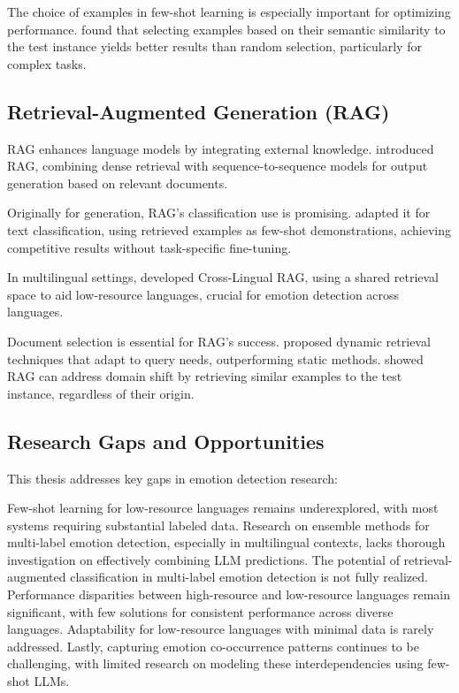 \documentclass[a4paper,12pt]{extarticle}
\begin{document}
The choice of examples in few-shot learning is especially important for optimizing performance. 
\cite{liu2022few} found that selecting examples based on their semantic similarity to the test instance yields better results than random selection, particularly for complex tasks. 

\subsection{Retrieval-Augmented Generation (RAG)}

RAG enhances language models by integrating external knowledge. 
\cite{lewis2020retrieval} introduced RAG, combining dense retrieval with sequence-to-sequence models for output generation based on relevant documents.

Originally for generation, RAG's classification use is promising. 
\cite{gao2024retrieval} adapted it for text classification, using retrieved examples as few-shot demonstrations, achieving competitive results without task-specific fine-tuning.

In multilingual settings, 
\cite{shi2023replug} developed Cross-Lingual RAG, using a shared retrieval space to aid low-resource languages, crucial for emotion detection across languages.

Document selection is essential for RAG's success. 
\cite{gao2023retrieval} proposed dynamic retrieval techniques that adapt to query needs, outperforming static methods. 
\cite{singh2022flare} showed RAG can address domain shift by retrieving similar examples to the test instance, regardless of their origin.
\subsection{Research Gaps and Opportunities}

This thesis addresses key gaps in emotion detection research: 

Few-shot learning for low-resource languages remains underexplored, 
with most systems requiring substantial labeled data. 
Research on ensemble methods for multi-label emotion detection, especially in multilingual contexts, lacks thorough investigation on effectively combining LLM predictions. 
The potential of retrieval-augmented classification in multi-label emotion detection is not fully realized. 
Performance disparities between high-resource and low-resource languages remain significant, with few solutions for consistent performance across diverse languages. 
Adaptability for low-resource languages with minimal data is rarely addressed. 
Lastly, capturing emotion co-occurrence patterns continues to be challenging, with limited research on modeling these interdependencies using few-shot LLMs.
\end{document}
